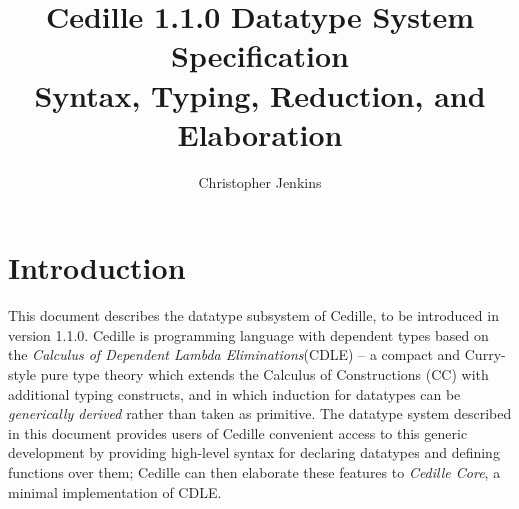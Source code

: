 \documentclass{article}
\begin{document}
\title{Cedille 1.1.0 Datatype System Specification \\ \large Syntax, Typing, Reduction,
  and Elaboration }

\author{Christopher Jenkins}

\maketitle
\tableofcontents
\newpage
\section{Introduction}
\label{sec:intro}
This document describes the datatype subsystem of Cedille, to be introduced in
version 1.1.0. Cedille is programming language with dependent types based on the
\textit{Calculus of Dependent Lambda Eliminations}(CDLE)\cite{St17_CDLE} -- a
compact and Curry-style pure type theory which extends the Calculus of
Constructions (CC)\cite{CH86_CC} with additional typing constructs, and in which
induction for datatypes can be \textit{generically
  derived}\cite{FBS18_Efficient-Mendler} rather than taken as primitive. The
datatype system described in this document provides users of Cedille convenient
access to this generic development by providing high-level syntax for declaring
datatypes and defining functions over them; Cedille can then elaborate these
features to \textit{Cedille Core}\cite{St18_Cedille-Core}, a minimal
implementation of CDLE.
\end{document}
